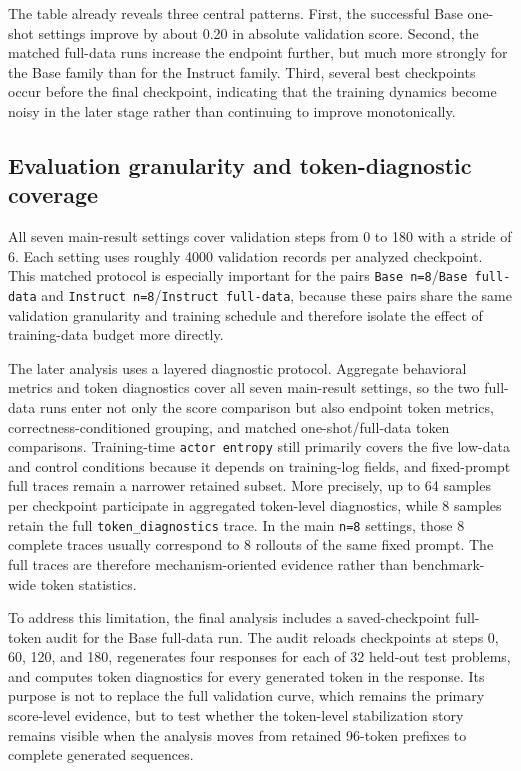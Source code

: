 \documentclass[12pt,a4paper]{ctexart}
\begin{document}
The table already reveals three central patterns. First, the successful Base one-shot settings improve by about 0.20 in absolute validation score. Second, the matched full-data runs increase the endpoint further, but much more strongly for the Base family than for the Instruct family. Third, several best checkpoints occur before the final checkpoint, indicating that the training dynamics become noisy in the later stage rather than continuing to improve monotonically.

\subsection{Evaluation granularity and token-diagnostic coverage}

All seven main-result settings cover validation steps from 0 to 180 with a stride of 6. Each setting uses roughly 4000 validation records per analyzed checkpoint. This matched protocol is especially important for the pairs \texttt{Base n=8}/\texttt{Base full-data} and \texttt{Instruct n=8}/\texttt{Instruct full-data}, because these pairs share the same validation granularity and training schedule and therefore isolate the effect of training-data budget more directly.

The later analysis uses a layered diagnostic protocol. Aggregate behavioral metrics and token diagnostics cover all seven main-result settings, so the two full-data runs enter not only the score comparison but also endpoint token metrics, correctness-conditioned grouping, and matched one-shot/full-data token comparisons. Training-time \texttt{actor entropy} still primarily covers the five low-data and control conditions because it depends on training-log fields, and fixed-prompt full traces remain a narrower retained subset. More precisely, up to 64 samples per checkpoint participate in aggregated token-level diagnostics, while 8 samples retain the full \texttt{token\_diagnostics} trace. In the main \texttt{n=8} settings, those 8 complete traces usually correspond to 8 rollouts of the same fixed prompt. The full traces are therefore mechanism-oriented evidence rather than benchmark-wide token statistics.

To address this limitation, the final analysis includes a saved-checkpoint full-token audit for the Base full-data run. The audit reloads checkpoints at steps 0, 60, 120, and 180, regenerates four responses for each of 32 held-out test problems, and computes token diagnostics for every generated token in the response. Its purpose is not to replace the full validation curve, which remains the primary score-level evidence, but to test whether the token-level stabilization story remains visible when the analysis moves from retained 96-token prefixes to complete generated sequences.
\end{document}
